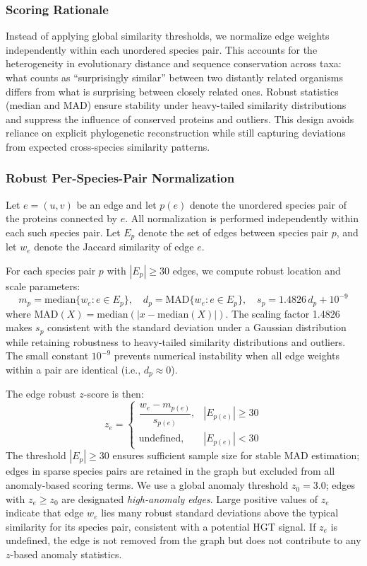 \documentclass[11pt]{article}
\begin{document}
\subsubsection{Scoring Rationale}

Instead of applying global similarity thresholds, we normalize edge weights independently within each unordered species pair. This accounts for the heterogeneity in evolutionary distance and sequence conservation across taxa: what counts as ``surprisingly similar'' between two distantly related organisms differs from what is surprising between closely related ones. Robust statistics (median and MAD) ensure stability under heavy-tailed similarity distributions and suppress the influence of conserved proteins and outliers. This design avoids reliance on explicit phylogenetic reconstruction while still capturing deviations from expected cross-species similarity patterns.

\subsubsection{Robust Per-Species-Pair Normalization}

Let $e = (u,v)$ be an edge and let $p(e)$ denote the unordered species pair of the proteins connected by $e$. All normalization is performed independently within each such species pair. Let $E_p$ denote the set of edges between species pair $p$, and let $w_e$ denote the Jaccard similarity of edge $e$.

For each species pair $p$ with $|E_p| \ge 30$ edges, we compute robust location and scale parameters:
\begin{equation}
m_p = \mathrm{median}\{w_e : e \in E_p\},\quad
d_p = \mathrm{MAD}\{w_e : e \in E_p\},\quad
s_p = 1.4826\,d_p + 10^{-9}
\end{equation}
where $\mathrm{MAD}(X) = \mathrm{median}(|x - \mathrm{median}(X)|)$. The scaling factor 1.4826 makes $s_p$ consistent with the standard deviation under a Gaussian distribution while retaining robustness to heavy-tailed similarity distributions and outliers\cite{Rousseeuw1993}. The small constant $10^{-9}$ prevents numerical instability when all edge weights within a pair are identical (i.e., $d_p \approx 0$).

The edge robust $z$-score is then:
\begin{equation}
z_e =
\begin{cases}
\dfrac{w_e - m_{p(e)}}{s_{p(e)}}, & |E_{p(e)}| \ge 30 \\[8pt]
\text{undefined}, & |E_{p(e)}| < 30
\end{cases}
\end{equation}
The threshold $|E_p| \ge 30$ ensures sufficient sample size for stable MAD estimation; edges in sparse species pairs are retained in the graph but excluded from all anomaly-based scoring terms. We use a global anomaly threshold $z_0 = 3.0$; edges with $z_e \ge z_0$ are designated \textit{high-anomaly edges}. Large positive values of $z_e$ indicate that edge $w_e$ lies many robust standard deviations above the typical similarity for its species pair, consistent with a potential HGT signal. If $z_e$ is undefined, the edge is not removed from the graph but does not contribute to any $z$-based anomaly statistics.
\end{document}
